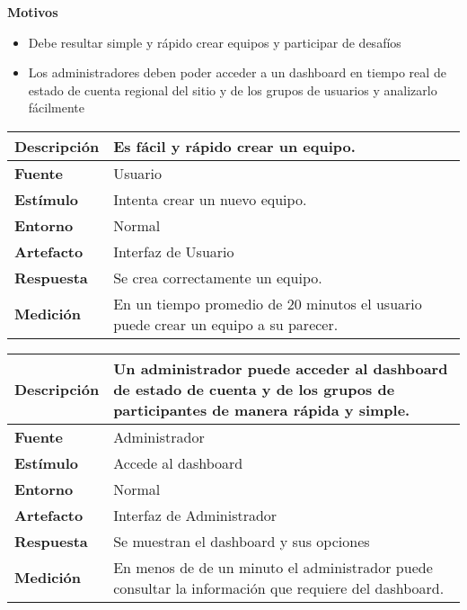 \textbf{Motivos}
\begin{itemize}
\item{Debe resultar simple y rápido crear equipos y participar de desafíos}
\item{Los administradores deben poder acceder a un dashboard en tiempo real de estado de cuenta regional del sitio y de los grupos de usuarios y analizarlo fácilmente}
\end{itemize}


\begin{center}
  \begin{tabular}{| l | p{10cm} | }
    \hline
	\textbf{Descripción} & Es fácil y rápido crear un equipo.\\  \hline
	\textbf{Fuente} & Usuario\\  \hline
	\textbf{Estímulo} & Intenta crear un nuevo equipo.\\  \hline
	\textbf{Entorno} & Normal\\  \hline
	\textbf{Artefacto} & Interfaz de Usuario\\  \hline
	\textbf{Respuesta} & Se crea correctamente un equipo.\\  \hline
	\textbf{Medición} & En un tiempo promedio de 20 minutos el usuario puede crear un equipo a su parecer.\\  \hline
  \end{tabular}
\end{center}


\begin{center}
  \begin{tabular}{| l | p{10cm} | }
    \hline
	\textbf{Descripción} & Un administrador puede acceder al dashboard de estado de cuenta y de los grupos de participantes de manera rápida y simple.\\  \hline
	\textbf{Fuente} & Administrador\\  \hline
	\textbf{Estímulo} & Accede al dashboard\\  \hline
	\textbf{Entorno} & Normal\\  \hline
	\textbf{Artefacto} & Interfaz de Administrador\\  \hline
	\textbf{Respuesta} & Se muestran el dashboard y sus opciones\\  \hline
	\textbf{Medición} & En menos de de un minuto el administrador puede consultar la información que requiere del dashboard.\\  \hline
  \end{tabular}
\end{center}
